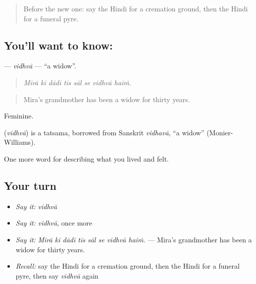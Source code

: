 \label{lesson:HI-C505-vidhva}



\begin{quote}
Before the new one: say the Hindi for a cremation ground, then the Hindi for a funeral pyre.
\end{quote}

\subsection*{You'll want to know: }
\textbf{} — \emph{vidhvā} — \textquotedblleft{}a widow\textquotedblright{}.

\begin{quote}
       
\end{quote}

\begin{quote}
\emph{Mīrā kī dādī tīs sāl se vidhvā haiṁ.}
\end{quote}

\begin{quote}
Mira's grandmother has been a widow for thirty years.
\end{quote}

Feminine.

\begin{cousinweb}
\textbf{} (\emph{vidhvā}) is a tatsama, borrowed from Sanskrit \emph{vidhavā}, \textquotedblleft{}a widow\textquotedblright{} (Monier-Williams).
\end{cousinweb}

\begin{grammarlens}[title={What you've built}]
One more word for describing what you lived and felt.
\end{grammarlens}

\subsection*{Your turn}
\begin{itemize}
\raggedright
  \item \emph{Say it:} \emph{vidhvā}
  \item \emph{Say it:} \emph{vidhvā}, once more
  \item \emph{Say it:} \emph{Mīrā kī dādī tīs sāl se vidhvā haiṁ.} — Mira's grandmother has been a widow for thirty years.
  \item \emph{Recall:} say the Hindi for a cremation ground, then the Hindi for a funeral pyre, then say \emph{vidhvā} again
\end{itemize}

